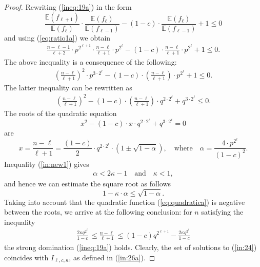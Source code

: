 \documentclass[11pt,twoside, reqno]{amsart}
\theoremstyle{plain}
\theoremstyle{definition}
\newcommand{\E}{\mathbb{E}}
\begin{document}
\begin{proof}
Rewriting (\ref{ineq:19a}) in the form
$$
\frac{\E(f_{\ell+1})}{\E(f_{\ell})}\cdot \frac{\E(f_{\ell})}{\E(f_{\ell-1})}-(1-c)\cdot\frac{\E(f_{\ell})}{\E(f_{\ell-1})}+1\le 0
$$
and using (\ref{eq:ratio1a}) we obtain
\begin{eqnarray*}
 \frac{n-\ell-1}{\ell+2}\cdot p^{2^{\ell+1}}\cdot \frac{n-\ell}{\ell+1}\cdot p^{2^{\ell}}- (1-c)\cdot \frac{n-\ell}{\ell+1}\cdot p^{2^{\ell}}+1\le 0.
\end{eqnarray*}
The above inequality is a consequence of the following:
\begin{eqnarray*}
 \left(\frac{n-\ell}{\ell+1}\right)^2\cdot p^{3\cdot 2^{\ell}}-(1-c)\cdot \left( \frac{n-\ell}{\ell+1}\right) \cdot p^{2^{\ell}}+1\le 0.
\end{eqnarray*}
The latter inequality can be rewritten as 
\begin{eqnarray}\label{eq:quadratica}
\left(\frac{n-\ell}{\ell+1}\right)^2 -(1-c)\cdot \left(\frac{n-\ell}{\ell+1}\right)\cdot q^{2\cdot 2^{\ell}}+  q^{3\cdot 2^\ell}\le 0. 
\end{eqnarray}
The roots of the quadratic equation $$x^2-(1-c)\cdot x\cdot q^{2\cdot 2^{\ell}} +q^{3\cdot 2^\ell}=0$$ are 
$$
x=\frac{n-\ell}{\ell+1} = \frac{(1-c)}{2}\cdot q^{2\cdot {2^\ell}}\cdot\left(1\pm \sqrt{1-\alpha}\right), \quad \mbox{where}\quad \alpha=\frac{4\cdot p^{2^\ell}}{(1-c)^2}.
$$
Inequality (\ref{in:new1}) gives 
\begin{eqnarray*}\label{eq:est}
\alpha <2\kappa-1 \quad \mbox{and}\quad \kappa <1,
\end{eqnarray*}
 and hence we can 
estimate the square root as follows
$$
1-\kappa\cdot \alpha \le \sqrt{1-\alpha}.%
$$
Taking into account that the quadratic function (\ref{eq:quadratica}) is negative between the roots, we arrive at the following conclusion: for $n$ satisfying the inequality
\begin{eqnarray}\label{in:24}
\frac{2\kappa q^{2^\ell}}{1-c} \, \le \frac{n-\ell}{\ell+1}\, \le (1-c)q^{ 2^{\ell+1}}-  \frac{2\kappa q^{2^\ell}}{1-c}
\end{eqnarray}
the strong domination (\ref{ineq:19a}) holds. Clearly, the set of solutions to (\ref{in:24}) coincides with $I_{\ell, c, \kappa}$, as defined in (\ref{in:26a}). 
\end{proof}
\end{document}
